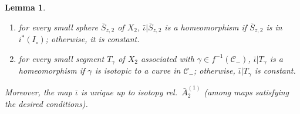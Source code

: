 \documentclass{amsart}
\theoremstyle{plain}
\newtheorem{lemma}[theorem]{Lemma}
\theoremstyle{definition}
\theoremstyle{remark}
\newcommand{\CC}{{\mathcal C}}
\begin{document}
\begin{lemma}
\begin{enumerate}[label=\text{(\roman*)},font=\normalfont,leftmargin=*]
\item\label{lem:bar iota:assump:cond2} for every small sphere $\bar S_{z,2}$ of $X_2$, $\bar \iota|\bar S_{z,2}$ is a homeomorphism if $\bar S_{z,2}$ is in $i^*(I_\circ)$; otherwise, it is constant.

\item\label{lem:bar iota:assump:cond3} for every small segment $T_{\gamma}$ of $X_2$ associated with $\gamma\in f^{-1}(\CC_-)$, $\bar \iota|T_{\gamma}$ is a homeomorphism if $\gamma$ is isotopic to a curve in $\CC_-$; otherwise, $\bar \iota|T_{\gamma}$ is constant.
\end{enumerate}

Moreover, the map $\bar \iota$ is unique up to isotopy rel.\ $\bar A_2^{(1)}$ (among maps satisfying the desired conditions).%
\end{lemma}
%
\end{document}
